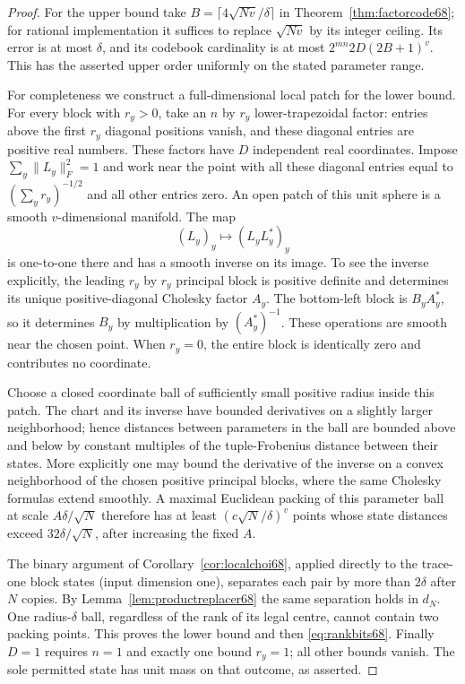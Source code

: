 \begin{proof}
For the upper bound take $B=\lceil4\sqrt{Nv}/\delta\rceil$ in
Theorem~\ref{thm:factorcode68}; for rational implementation it suffices
to replace $\sqrt{Nv}$ by its integer ceiling. Its error is at most
$\delta$, and its codebook cardinality is at most
$2^{mn}2D(2B+1)^v$. This has the asserted upper order uniformly on
the stated parameter range.

For completeness we construct a full-dimensional local patch for the
lower bound. For every block with $r_y>0$, take an $n$ by $r_y$
lower-trapezoidal factor: entries above the first $r_y$ diagonal
positions vanish, and these diagonal entries are positive real
numbers. These factors have $D$ independent real coordinates. Impose
$\sum_y\|L_y\|_F^2=1$ and work near the point with all these diagonal
entries equal to $(\sum_y r_y)^{-1/2}$ and all other entries zero.
An open patch of this unit sphere is a smooth $v$-dimensional manifold.
The map
\[
                         (L_y)_y\longmapsto(L_yL_y^*)_y
\]
is one-to-one there and has a smooth inverse on its image. To see the
inverse explicitly, the leading $r_y$ by $r_y$ principal block is
positive definite and determines its unique positive-diagonal Cholesky
factor $A_y$. The bottom-left block is $B_yA_y^*$, so it determines
$B_y$ by multiplication by $(A_y^*)^{-1}$. These operations are smooth
near the chosen point. When $r_y=0$, the entire block is identically
zero and contributes no coordinate.

Choose a closed coordinate ball of sufficiently small positive radius
inside this patch. The chart and its inverse have bounded derivatives
on a slightly larger neighborhood; hence distances between parameters
in the ball are bounded above and below by constant multiples of the
tuple-Frobenius distance between their states. More explicitly one
may bound the derivative of the inverse on a convex neighborhood of
the chosen positive principal blocks, where the same Cholesky formulas
extend smoothly. A maximal Euclidean packing of this parameter ball
at scale $A\delta/\sqrt N$ therefore has at least
$(c\sqrt N/\delta)^v$ points whose state distances exceed
$32\delta/\sqrt N$, after increasing the fixed $A$.

The binary argument of Corollary~\ref{cor:localchoi68}, applied
directly to the trace-one block states (input dimension one), separates
each pair by more than $2\delta$ after $N$ copies. By
Lemma~\ref{lem:productreplacer68} the same separation holds in $d_N$.
One radius-$\delta$ ball, regardless of the rank of its legal centre,
cannot contain two packing points. This proves the lower bound and
then \eqref{eq:rankbits68}. Finally $D=1$ requires $n=1$ and exactly
one bound $r_y=1$; all other bounds vanish. The sole permitted state
has unit mass on that outcome, as asserted.
\end{proof}

